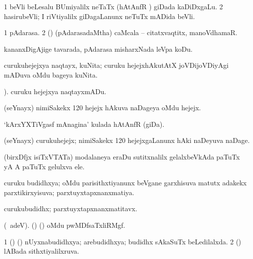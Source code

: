 \bentry
{}
\gl{\nA}
\expl{}
\bmng
\bnum
\num{1} beVli beLesalu BUmiyalilx neTaTx (hAtAnfR \mo) giDada kaDiDxgaLu. 
\num{2} hasirubeVli; I riVtiyalilx giDagaLanunx neTuTx mADida beVli. 
\enum
\emng
\eentry

\bentry
{}
\gl{\nA}
\bmng
\bnum
\num{1} pAdarasa. 
\num{2} (\rUpa) (pAdarasadaMtha) caMcala -- citatxvaqtitx, manoVdhamaR. 
\enum
\emng
\eentry

\bentry
{}
\gl{\sakirx}
\expl{}
\bmng
kananxDigAjige tavarada, pAdarasa misharxNada leVpa koDu. 
\emng
\eentry

\bentry
{}
\gl{\nA}
\bmng
curukuhejejxya naqtayx, kuNita; curuku hejejxhAkutAtX joVDijoVDiyAgi mADuva oMdu bageya kuNita. 
\emng
\eentry

\bentry
{}
\gl{\akirx}
).\bmng
curuku hejejxya naqtayxmADu. 
\emng
\eentry

\bentry
{}
\gl{\nA}
\bmng
(seYnayx) nimiSakekx {\rm 120} hejejx hAkuva naDageya oMdu hejejx. 
\emng
\eentry

\bentry
{}
\gl{\nA}
\bmng
`kArxYXTiVgasf mAnagina' kulada hAtAnfR (giDa). 
\emng
\eentry

\bentry
{}
\gl{\nA}
\bmng
(seYnayx) curukuhejejx; nimiSakekx {\rm 120} hejejxgaLanunx hAki naDeyuva naDage. 
\emng
\eentry

\bentry
{}
\gl{\nA}
\bmng
(birxDfjx isiTxVTATa) modalaneya eraDu sutitxnalilx gelalxbeVkAda paTuTx yA A paTuTx gelulxva ele. 
\emng
\eentry

\bentry
{}
\gl{\gu}
\bmng
curuku budidhxya; oMdu parisithxtiyanunx beVgane garxhisuva matutx adakekx parxtikirxyisuva; parxtuyxtapxnanxmatiya. 
\emng
\eentry

\bentry
{}
\gl{\nA}
\bmng
curukubudidhx; parxtuyxtapxnanxmatitavx. 
\emng
\eentry

\bentry
{}
\gl{\nA}
\bmng
 (\bava\ adeV). (\birx) (\ashi) oMdu pwMDfsaTxliRMgf. 
\emng

\noindent
\gl{\pagu}
\bmng
\bnum
\num{1}  (\AseTxrXV) (\ashi) nUyxnabudidhxya; arebudidhxya; budidhx sAkaSuTx beLedilalxda. 
\num{2}  (\ashi) lABada sithxtiyalilxruva. 
\enum
\emng
\eentry


